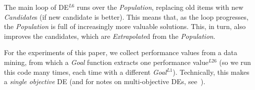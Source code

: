 The main loop of DE$^{L6}$ runs over the {\em Population}, replacing old items
with new {\em Candidate}s (if  new candidate is better).
This means that, as the loop progresses, the {\em Population} is full of increasingly
more valuable solutions. This, in turn, also improves  the candidates, which are {\em Extrapolate}d
from the {\em Population}.

For the experiments of this paper, we collect performance
values from a data mining, from which a {\em Goal} function extracts one 
performance value$^{L26}$ (so we run this code many times, each time with
a different {\em Goal}$^{L1}$).  Technically, this makes a  {\em single objective} DE (and for notes on multi-objective DEs, see~\cite{Coello05,zhang07,5583335}).


